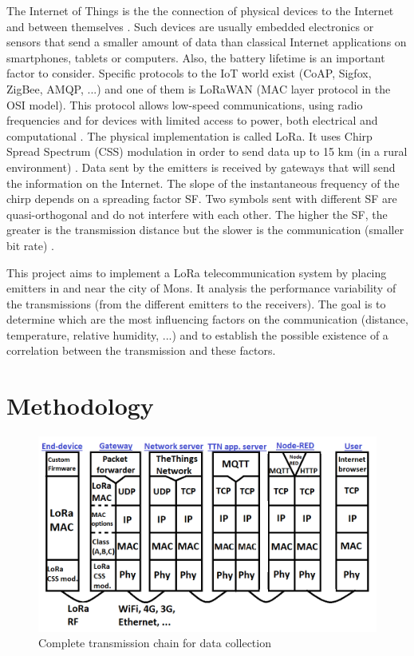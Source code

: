 \documentclass[letterpaper, 10 pt, conference]{ieeeconf}  %
\begin{document}
The Internet of Things is the the connection of physical devices to the Internet and between themselves \cite{c1}. Such devices are usually embedded electronics or sensors that send a smaller amount of data than classical Internet applications on smartphones, tablets or computers. Also, the battery lifetime is an important factor to consider. Specific protocols to the IoT world exist (CoAP, Sigfox, ZigBee, AMQP, ...\cite{c3}\cite{c17}) and one of them is LoRaWAN (MAC layer protocol in the OSI model). This protocol allows low-speed communications, using radio frequencies and for devices with limited access to power, both electrical and computational \cite{c4}. The physical implementation is called LoRa. It uses Chirp Spread Spectrum (CSS) modulation in order to send data up to 15 km (in a rural environment) \cite{c5}\cite{c19}. Data sent by the emitters is received by gateways that will send the information on the Internet. The slope of the instantaneous  frequency of the chirp depends on a spreading factor SF. Two symbols sent with different SF are quasi-orthogonal and do not interfere with each other. The higher the SF, the greater is the transmission distance but the slower is the communication (smaller bit rate) \cite{c5}.

This project aims to implement a LoRa telecommunication system by placing emitters in and near the city of Mons. It analysis the performance variability of the transmissions (from the different emitters to the receivers). The goal is to determine which are the most influencing factors on the communication (distance, temperature, relative humidity, ...) and to establish the possible existence of a correlation between the transmission and these factors.

\section{Methodology}

\begin{figure}[ht!]
\centering
\includegraphics[scale=0.32]{tx_chain.png}
\caption{Complete transmission chain for data collection}
\label{chain}
\end{figure}
\end{document}
